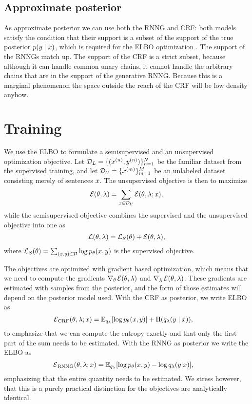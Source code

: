   \subsection{Approximate posterior}
    As approximate posterior we can use both the RNNG and CRF: both models satisfy the condition that their support is a subset of the support of the true posterior $p(y \mid x)$, which is required for the ELBO optimization \citep{kucukelbir2017automatic}. The support of the RNNGs match up. The support of the CRF is a strict subset, because although it can handle common unary chains, it cannot handle the arbitrary chains that are in the support of the generative RNNG. Because this is a marginal phenomenon the space outside the reach of the CRF will be low density anyhow.

\section{Training}
  We use the ELBO to formulate a semisupervised and an unsupervised optimization objective. Let $\mathcal{D}_L = \{ (x^{(n)}, y^{(n)})\}_{n=1}^N$ be the familiar dataset from the supervised training, and let $\mathcal{D}_U = \{ x^{(m)} \}_{m=1}^M$ be an unlabeled dataset consisting merely of sentences $x$. The unsupervised objective is then to maximize
  \begin{align}
    \operatorname{\mathcal{E}}(\theta, \lambda) = \sum_{ x \in \mathcal{D}_U } \operatorname{\mathcal{E}}(\theta, \lambda; x),
  \end{align}
  while the semisupervised objective combines the supervised and the unsupervised objective into one as
  \begin{align*}
    \operatorname{\mathcal{L}}(\theta, \lambda) = \operatorname{\mathcal{L}}_{S}(\theta) + \operatorname{\mathcal{E}}(\theta, \lambda),
  \end{align*}
  where $\operatorname{\mathcal{L}}_{S}(\theta) = \sum_{ (x, y) \in \mathcal{D} } \log p_{\theta}(x, y)$ is the supervised objective.

  The objectives are optimized with gradient based optimization, which means that we need to compute the gradients $\nabla_{\theta} \operatorname{\mathcal{E}}(\theta, \lambda)$ and $\nabla_{\lambda} \operatorname{\mathcal{E}}(\theta, \lambda)$. These gradients are estimated with samples from the posterior, and the form of those estimates will depend on the posterior model used. With the CRF as posterior, we write ELBO as
  \begin{align}
    \operatorname{\mathcal{E}}_{\text{CRF}}(\theta, \lambda; x)
      &= \operatorname{\mathbb{E}}_{q_{\lambda}} [ \log p_{\theta}( x, y ) ] + \operatorname{H}(q_{\lambda}(y \mid x)),
  \end{align}
  to emphasize that we can compute the entropy exactly and that only the first part of the sum needs to be estimated. With the RNNG as posterior we write the ELBO as
  \begin{align}
    \operatorname{\mathcal{E}}_{\text{RNNG}}(\theta, \lambda; x)
      &= \operatorname{\mathbb{E}}_{q_{\lambda}} [ \log p_{\theta}( x, y ) - \log q_{\lambda}(y | x) ],
  \end{align}
  emphasizing that the entire quantity needs to be estimated. We stress however, that this is a purely practical distinction for the objectives are analytically identical.

